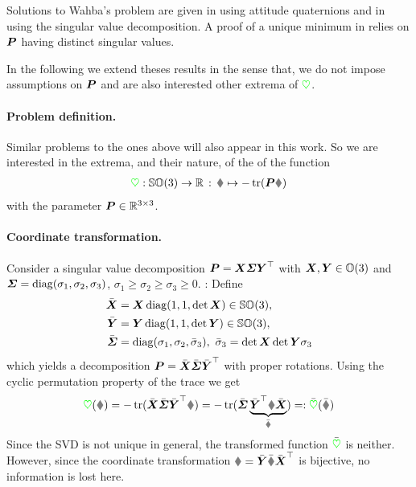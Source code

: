 Solutions to Wahba's problem are given in \cite{Davenport:QMethod} using attitude quaternions and in \cite{Kabsch:SSVD} using the singular value decomposition.
A proof of a unique minimum in \cite{Bullo:TrackingAutomatica} relies on $\boldsymbol{P}$ having distinct singular values.

In the following we extend theses results in the sense that, we do not impose assumptions on $\boldsymbol{P}$ and are also interested other extrema of $\textcolor{green}{\heartsuit}$.

\paragraph{Problem definition.}
Similar problems to the ones above will also appear in this work.
So we are interested in the extrema, and their nature, of the of the function
\begin{align}
 \potentialEnergy: \SpecialOrthogonalGroup(3) \rightarrow \RealNum \, : \, \R \mapsto -\tr(\mat{P} \R)
\end{align}
with the parameter $\boldsymbol{P} \in \mathbb{R}^{3\times3}$.

\paragraph{Coordinate transformation.}
Consider a singular value decomposition $\boldsymbol{P} = \boldsymbol{X} \boldsymbol{\varSigma} \boldsymbol{Y}^\top$ with $\boldsymbol{X}, \boldsymbol{Y} \in \mathbb{O}(3)$ and $\boldsymbol{\varSigma} = \operatorname{diag}(\sigma_1, \sigma_2, \sigma_3)$, $\sigma_1 \geq \sigma_2 \geq \sigma_3 \geq 0$.
\cite{Kabsch:SSVD}: Define 
\begin{subequations}
\begin{align}
 \bar{\boldsymbol{X}} &= \boldsymbol{X} \operatorname{diag}(1, 1, \det\boldsymbol{X}) \in \mathbb{SO}(3),
\\
 \bar{\boldsymbol{Y}} &= \boldsymbol{Y} \operatorname{diag}(1, 1, \det\boldsymbol{Y}) \in \mathbb{SO}(3),
\\
 \bar{\boldsymbol{\varSigma}} &= \operatorname{diag}(\sigma_1, \sigma_2, \bar{\sigma}_3), \ \bar{\sigma}_3 = \det\boldsymbol{X}\det\boldsymbol{Y} \sigma_3
\end{align} 
\end{subequations}
which yields a decomposition $\boldsymbol{P} = \bar{\boldsymbol{X}} \bar{\boldsymbol{\varSigma}} \bar{\boldsymbol{Y}}^\top$ with proper rotations.
Using the cyclic permutation property of the trace we get
\begin{align}
 \potentialEnergy(\R) = -\tr( \bar{\mat{X}} \bar{\mat{\varSigma}} \bar{\mat{Y}}^\top \R) = -\tr( \bar{\mat{\varSigma}} \underbrace{\bar{\mat{Y}}^\top \R \bar{\mat{X}}}_{\bar{\R}}) =: \bar{\potentialEnergy}(\bar{\R})
\end{align}
Since the SVD is not unique in general, the transformed function $\bar{\textcolor{green}{\heartsuit}}$ is neither.
However, since the coordinate transformation $\R = \bar{\mat{Y}} \bar{\R} \bar{\mat{X}}^\top$ is bijective, no information is lost here.

